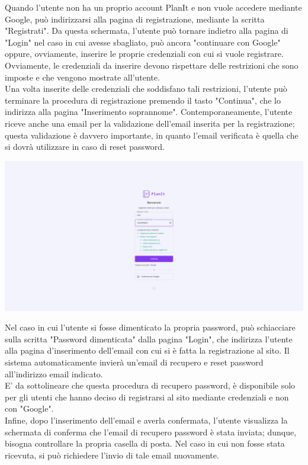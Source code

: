 Quando l'utente non ha un proprio account PlanIt e non vuole accedere mediante Google, può indirizzarsi alla pagina di registrazione, mediante la scritta "Registrati". Da questa schermata, l'utente può tornare indietro alla pagina di "Login" nel caso in cui avesse sbagliato, può ancora "continuare con Google" oppure, ovviamente, inserire le proprie credenziali con cui si vuole registrare. Ovviamente, le credenziali da inserire devono rispettare delle restrizioni che sono imposte e che vengono mostrate all'utente.\\
Una volta inserite delle credenziali che soddisfano tali restrizioni, l'utente può terminare la procedura di registrazione premendo il tasto "Continua", che lo indirizza alla pagina "Inserimento soprannome". Contemporaneamente, l'utente riceve anche una email per la validazione dell'email inserita per la registrazione; questa validazione è davvero importante, in quanto l'email verificata è quella che si dovrà utilizzare in caso di reset password.

\begin{center}
    \includegraphics[width=1\textwidth, height=0.3\textheight]{img/png/FrontEnd/Homepage_Autenticazione/registrazione_valida.png}
\end{center}

Nel caso in cui l'utente si fosse dimenticato la propria password, può schiacciare sulla scritta "Password dimenticata" dalla pagina "Login", che indirizza l'utente alla pagina d'inserimento dell'email con cui si è fatta la registrazione al sito. Il sistema automaticamente invierà un'email di recupero e reset password all'indirizzo email indicato. \\
E' da sottolineare che questa procedura di recupero password, è disponibile solo per gli utenti che hanno deciso di registrarsi al sito mediante credenziali e non con "Google". \\
Infine, dopo l'inserimento dell'email e averla confermata, l'utente visualizza la schermata di conferma che l'email di recupero password è stata inviata; dunque, bisogna controllare la propria casella di posta. Nel caso in cui non fosse stata ricevuta, si può richiedere l'invio di tale email nuovamente.

